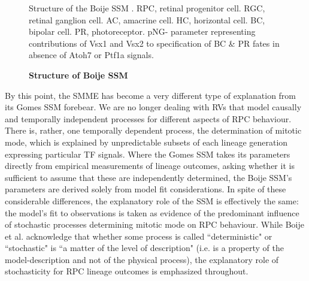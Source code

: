 \documentclass{ut-thesis}
\begin{document}
\begin{NoHyper}
\begin{figure}[!h]
\caption{{\bf Structure of Boije SSM}}
Structure of the Boije SSM \cite{Boije2015}. RPC, retinal progenitor cell. RGC, retinal ganglion cell. AC, amacrine cell. HC, horizontal cell. BC, bipolar cell. PR, photoreceptor. pNG- parameter representing contributions of Vsx1 and Vsx2 to specification of BC \& PR fates in absence of Atoh7 or Ptf1a signals.
\label{BoijeSSM}
\end{figure}

By this point, the SMME has become a very different type of explanation from its Gomes SSM forebear. We are no longer dealing with RVs that model causally and temporally independent processes for different aspects of RPC behaviour. There is, rather, one temporally dependent process, the determination of mitotic mode, which is explained by unpredictable subsets of each lineage generation expressing particular TF signals. Where the Gomes SSM takes its parameters directly from empirical measurements of lineage outcomes, asking whether it is sufficient to assume that these are independently determined, the Boije SSM's parameters are derived solely from model fit considerations. In spite of these considerable differences, the explanatory role of the SSM is effectively the same: the model's fit to observations is taken as evidence of the predominant influence of stochastic processes determining mitotic mode on RPC behaviour. While Boije et al. acknowledge that whether some process is called ``deterministic" or ``stochastic" is ``a matter of the level of description" \cite{Boije2015} (i.e. is a property of the model-description and not of the physical process), the explanatory role of stochasticity for RPC lineage outcomes is emphasized throughout.


\end{NoHyper}
\end{document}
